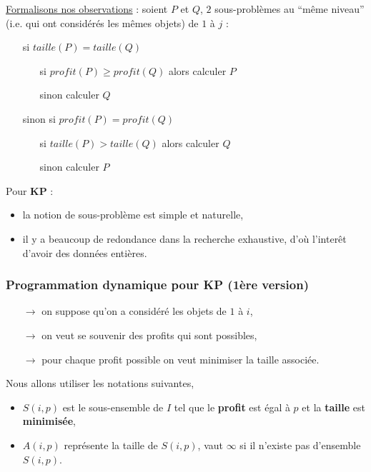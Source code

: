 \documentclass[12pt]{article}
\newcommand{\titre}[1]{\textcolor{title}{#1}}
\begin{document}
\noindent \underline{Formalisons nos observations} : soient $P$ et $Q$, $2$ sous-problèmes au ``même niveau''  \\ (i.e. qui ont considérés
les mêmes objets) de $1$ à $j$ :
\begin{itemize}
\item[si] $taille(P) = taille(Q)$
	\begin{itemize}
	\item[si] $profit(P) \geq profit(Q)$ alors calculer $P$
	\item[sinon] calculer $Q$
	\end{itemize}
\item[sinon si] $profit(P) = profit(Q)$
	\begin{itemize}
	\item[si] $taille(P) > taille (Q)$ alors calculer $Q$
	\item[sinon] calculer $P$ \\
	\end{itemize}
\end{itemize}

\noindent Pour \textbf{\titre{KP}} :
\begin{itemize}
\item la notion de sous-problème est simple et naturelle,
\item il y a beaucoup de redondance dans la recherche exhaustive, d'où l'interêt d'avoir des données entières.
\end{itemize}



\subsubsection{Programmation dynamique pour \titre{KP} (1ère version)}
\begin{itemize}
\item[$\rightarrow$] on suppose qu'on a considéré les objets de $1$ à $i$,
\item[$\rightarrow$] on veut se souvenir des profits qui sont possibles,
\item[$\rightarrow$] pour chaque profit possible on veut minimiser la taille associée.
\end{itemize}

Nous allons utiliser les notations suivantes,
\begin{itemize}
\item $S(i,p)$ est le sous-ensemble de $I$ tel que le \textbf{profit} est égal à $p$ et la \textbf{taille} est \textbf{minimisée},
\item $A(i,p)$ représente la taille de $S(i,p)$, vaut $\infty$ si il n'existe pas d'ensemble $S(i,p)$.
\end{itemize}
\end{document}
